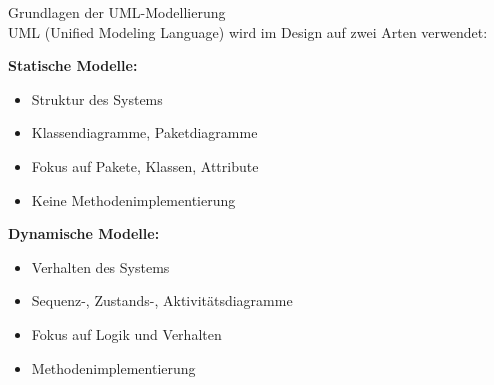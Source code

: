 \begin{concept}{Grundlagen der UML-Modellierung}\\
UML (Unified Modeling Language) wird im Design auf zwei Arten verwendet:

\textbf{Statische Modelle:}
\begin{itemize}
    \item Struktur des Systems
    \item Klassendiagramme, Paketdiagramme
    \item Fokus auf Pakete, Klassen, Attribute
    \item Keine Methodenimplementierung
\end{itemize}

\textbf{Dynamische Modelle:}
\begin{itemize}
    \item Verhalten des Systems
    \item Sequenz-, Zustands-, Aktivitätsdiagramme
    \item Fokus auf Logik und Verhalten
    \item Methodenimplementierung
\end{itemize}
\end{concept}

